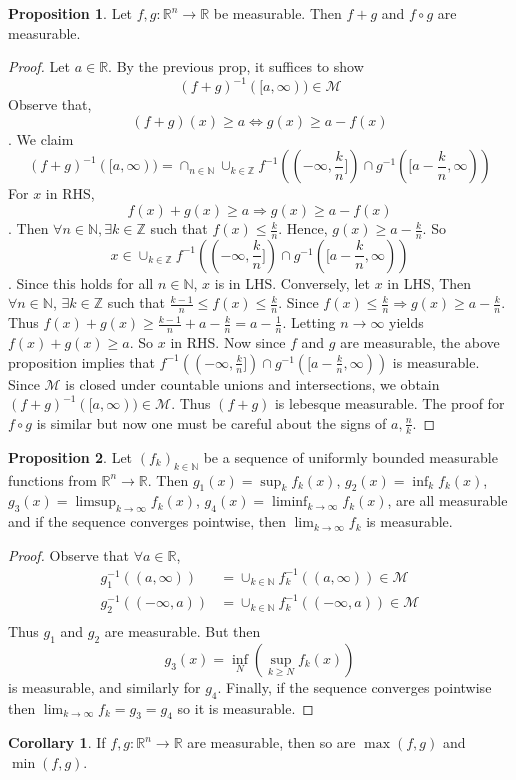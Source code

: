 \documentclass{article}
\theoremstyle{definition}
\newtheorem{prop}{Proposition}[section]
\newtheorem{corollary}{Corollary}[theorem]
\theoremstyle{remark}
\theoremstyle{remark}
\def\reals{{\mathbb R}}
\def\scriptm{{\mathcal M}}
\def\integers{{\mathbb Z}}
\def\naturals{{\mathbb N}}
\begin{document}
\begin{prop}
Let $f,g: \reals^n \to \reals$ be measurable. Then $f + g$ and $f \circ g$ are measurable.
\end{prop}
\begin{proof}
Let $a \in \reals$. By the previous prop, it suffices to show $$(f + g)^{-1}([a, \infty)) \in\scriptm$$
Observe that, $$(f + g)(x) \geq a \Leftrightarrow g(x) \geq a - f(x)$$.
We claim $$ (f + g)^{-1} ([a, \infty)) = \cap_{n\in\naturals} \cup_{k\in\integers} f^{-1}((-\infty, \frac{k}{n}]) \cap g^{-1}([a - \frac{k}{n}, \infty))$$
For $x$ in RHS, $$f(x) + g(x) \geq a \Rightarrow g(x) \geq a - f(x)$$. 
Then $\forall n \in \naturals, \exists k \in \integers$ such that $f(x) \leq \frac{k}{n}$. Hence, $g(x) \geq a - \frac{k}{n}$. So $$x\in \cup_{k\in\integers} f^{-1}((-\infty, \frac{k}{n}]) \cap g^{-1}([a - \frac{k}{n}, \infty))$$. 
Since this holds for all $n\in\naturals$, $x$ is in LHS.
Conversely, let $x$ in LHS, Then $\forall n\in\naturals$, $\exists k \in \integers$ such that $\frac{k-1}{n} \leq f(x) \leq \frac{k}{n}$. Since $f(x) \leq \frac{k}{n} \Rightarrow g(x) \geq a - \frac{k}{n}$. Thus $f(x) + g(x) \geq \frac{k-1}{n} + a - \frac{k}{n} = a - \frac{1}{n}$. Letting $n\to\infty$ yields $f(x) + g(x) \geq a$. So $x$ in RHS. Now since $f$ and $g$ are measurable, the above proposition implies that $f^{-1}((-\infty, \frac{k}{n}]) \cap g^{-1}([a - \frac{k}{n}, \infty))$ is measurable. Since $\scriptm$ is closed under countable unions and intersections, we obtain $(f + g)^{-1}([a, \infty))\in \scriptm$. Thus $(f + g)$ is lebesque measurable. The proof for $f \circ g$ is similar but now one must be careful about the signs of $a, \frac{n}{k}$.   
\end{proof}
\begin{prop}
Let $(f_k)_{k\in\naturals}$ be a sequence of uniformly bounded measurable functions from $\reals^n \to \reals$. Then $g_1(x) = \sup_k f_k(x)$, $g_2(x) = \inf_k f_k(x)$, $g_3(x) = \limsup_{k\to\infty} f_k(x)$, $g_4(x) = \liminf_{k\to\infty} f_k(x)$, are all measurable and if the sequence converges pointwise, then $\lim_{k\to\infty} f_k$ is measurable.
\end{prop}
\begin{proof}
Observe that $\forall a \in \reals$, 
\begin{align*}
g_1^{-1}((a, \infty)) &= \cup_{k\in\naturals} f_k^{-1}((a, \infty)) \in \scriptm \\
g_2^{-1}((-\infty, a)) &= \cup_{k\in\naturals} f_k^{-1}((-\infty, a)) \in \scriptm \\
\end{align*}
Thus $g_1$ and $g_2$ are measurable. But then $$g_3(x) = \inf_N(\sup_{k\geq N} f_k(x))$$ is measurable, and similarly for $g_4$. Finally, if the sequence converges pointwise then $\lim_{k\to\infty} f_k = g_3 = g_4$ so it is measurable.
\end{proof}
\begin{corollary}
If $f,g: \reals^n \to \reals$ are measurable, then so are $\max(f, g)$ and $\min(f, g)$.
\end{corollary}
\end{document}
